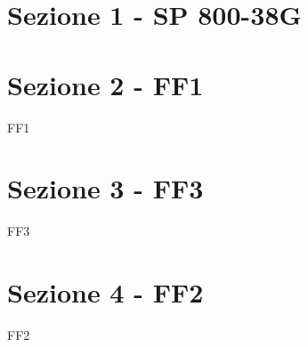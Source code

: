
\section {Sezione 1 - SP 800-38G}



\section {Sezione 2 - FF1}

FF1

\section {Sezione 3 - FF3}

FF3

\section {Sezione 4 - FF2}

FF2
